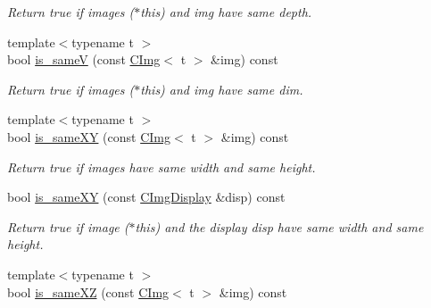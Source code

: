 \begin{DoxyCompactItemize}
\begin{DoxyCompactList}\small\item\em Return {\ttfamily true} if images {\ttfamily }($\ast$this) and {\ttfamily img} have same depth. \end{DoxyCompactList}\item 
\hypertarget{structcimg__library_1_1_c_img_a3ce58038ed493364b7586ae78cdad865}{{\footnotesize template$<$typename t $>$ }\\bool \hyperlink{structcimg__library_1_1_c_img_a3ce58038ed493364b7586ae78cdad865}{is\-\_\-same\-V} (const \hyperlink{structcimg__library_1_1_c_img}{C\-Img}$<$ t $>$ \&img) const }\label{structcimg__library_1_1_c_img_a3ce58038ed493364b7586ae78cdad865}

\begin{DoxyCompactList}\small\item\em Return {\ttfamily true} if images {\ttfamily }($\ast$this) and {\ttfamily img} have same dim. \end{DoxyCompactList}\item 
\hypertarget{structcimg__library_1_1_c_img_a1c5bb2a370ad51474d0545490433742f}{{\footnotesize template$<$typename t $>$ }\\bool \hyperlink{structcimg__library_1_1_c_img_a1c5bb2a370ad51474d0545490433742f}{is\-\_\-same\-X\-Y} (const \hyperlink{structcimg__library_1_1_c_img}{C\-Img}$<$ t $>$ \&img) const }\label{structcimg__library_1_1_c_img_a1c5bb2a370ad51474d0545490433742f}

\begin{DoxyCompactList}\small\item\em Return {\ttfamily true} if images have same width and same height. \end{DoxyCompactList}\item 
\hypertarget{structcimg__library_1_1_c_img_aea56577e695bd44512d4acecac27a3a5}{bool \hyperlink{structcimg__library_1_1_c_img_aea56577e695bd44512d4acecac27a3a5}{is\-\_\-same\-X\-Y} (const \hyperlink{structcimg__library_1_1_c_img_display}{C\-Img\-Display} \&disp) const }\label{structcimg__library_1_1_c_img_aea56577e695bd44512d4acecac27a3a5}

\begin{DoxyCompactList}\small\item\em Return {\ttfamily true} if image {\ttfamily }($\ast$this) and the display {\ttfamily disp} have same width and same height. \end{DoxyCompactList}\item 
\hypertarget{structcimg__library_1_1_c_img_a7c1fc89cb31ce9f2735dc0666cec049f}{{\footnotesize template$<$typename t $>$ }\\bool \hyperlink{structcimg__library_1_1_c_img_a7c1fc89cb31ce9f2735dc0666cec049f}{is\-\_\-same\-X\-Z} (const \hyperlink{structcimg__library_1_1_c_img}{C\-Img}$<$ t $>$ \&img) const }\label{structcimg__library_1_1_c_img_a7c1fc89cb31ce9f2735dc0666cec049f}


\end{DoxyCompactItemize}
